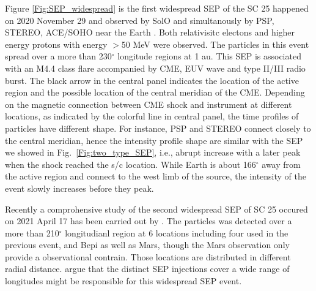 Figure \ref{Fig:SEP_widespread} is the first widespread \ac{SEP} of the \ac{SC} 25 happened on 2020 November 29 and observed by \ac{SolO} and simultanously by \ac{PSP}, \ac{STEREO}, \acl{ACE}/\ac{SOHO} near the Earth \citep{Kolhoff2021AA, Kouloumvakos2022AA, Palmerio2022SpWea}. Both relativisitc electons and higher energy protons with energy $>$50 MeV were observed.  The particles in this event spread over a more than 230$^\circ$ longitude regions at 1 au. This SEP is associated with an M4.4 class flare accompanied by \ac{CME}, \ac{EUV} wave and type II/III radio burst. The black arrow in the central panel indicates the location of the active region and the possible location of the central meridian of the \ac{CME}.  Depending on the magnetic connection between \ac{CME} shock and instrument at different locations, as indicated by the colorful line in central panel, the time profiles of particles have different shape. For instance, \ac{PSP} and \ac{STEREO} connect closely to the central meridian, hence the intensity profile shape are similar with the \ac{SEP} we showed in Fig.~\ref{Fig:two_type_SEP}, i.e., abrupt increase with a later peak when the shock reached the s/c location. While Earth is about 166$^\circ$ away from the active region and connect to the west limb of the source, the intensity of the event slowly increases before they peak.

Recently a comprohensive study of the second widespread \ac{SEP} of \ac{SC} 25 occured on 2021 April 17 has been carried out by \citep{dresing202317}. The particles was detected over a more than 210$^\circ$ longitudianl region at 6 locations including four used in the previous event, and \ac{Bepi} as well as Mars, though the Mars observation only provide a observational contrain. Those locations are distributed in different radial distance. \citep{dresing202317} argue that the distinct SEP injections cover a wide range of longitudes might be responsible for this widespread SEP event.

